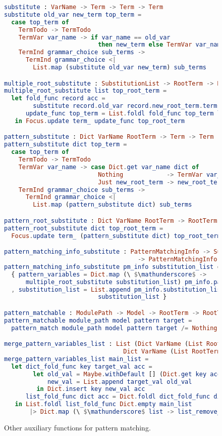 \documentclass[master.tex]{subfiles}
\begin{document}
\begin{figure}[H]
\begin{framed}
\begin{lstlisting}[language=elm,basicstyle=\scriptsize\ttfamily]
substitute : VarName -> Term -> Term -> Term
substitute old_var new_term top_term =
  case top_term of
    TermTodo -> TermTodo
    TermVar var_name -> if var_name == old_var
                          then new_term else TermVar var_name
    TermInd grammar_choice sub_terms ->
      TermInd grammar_choice <|
        List.map (substitute old_var new_term) sub_terms

multiple_root_substitute : SubstitutionList -> RootTerm -> RootTerm
multiple_root_substitute list top_root_term =
  let fold_func record acc =
        substitute record.old_var record.new_root_term.term acc
      update_func top_term = List.foldl fold_func top_term list
   in Focus.update term_ update_func top_root_term

pattern_substitute : Dict VarName RootTerm -> Term -> Term
pattern_substitute dict top_term =
  case top_term of
    TermTodo -> TermTodo
    TermVar var_name -> case Dict.get var_name dict of
                          Nothing            -> TermVar var_name
                          Just new_root_term -> new_root_term.term
    TermInd grammar_choice sub_terms ->
      TermInd grammar_choice <|
        List.map (pattern_substitute dict) sub_terms

pattern_root_substitute : Dict VarName RootTerm -> RootTerm -> RootTerm
pattern_root_substitute dict top_root_term =
  Focus.update term_ (pattern_substitute dict) top_root_term

pattern_matching_info_substitute : PatternMatchingInfo -> SubstitutionList
                                     -> PatternMatchingInfo
pattern_matching_info_substitute pm_info substitution_list =
  { pattern_variables = Dict.map (\ $\mathunderscore$ ->
      multiple_root_substitute substitution_list) pm_info.pattern_variables
  , substitution_list = List.append pm_info.substitution_list
                          substitution_list }

pattern_matchable : ModulePath -> Model -> RootTerm -> RootTerm -> Bool
pattern_matchable module_path model pattern target =
  pattern_match module_path model pattern target /= Nothing

merge_pattern_variables_list : List (Dict VarName (List RootTerm)) ->
                                 Dict VarName (List RootTerm)
merge_pattern_variables_list main_list =
  let dict_fold_func key target_val acc =
        let old_val = Maybe.withDefault [] (Dict.get key acc)
            new_val = List.append target_val old_val
         in Dict.insert key new_val acc
      list_fold_func dict acc = Dict.foldl dict_fold_func dict acc
   in List.foldl list_fold_func Dict.empty main_list
       |> Dict.map (\ $\mathunderscore$ list -> list_remove_duplication list)
\end{lstlisting}
\end{framed}
\caption{Other auxiliary functions for pattern matching.}
\label{fig:supp-auxiliary}
\end{figure}
\end{document}

